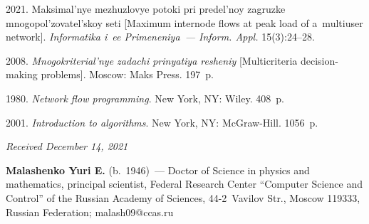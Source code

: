   \begin{multicols}{2}

\renewcommand{\bibname}{\protect\rmfamily References}

{\small\frenchspacing
 {%
 \begin{thebibliography}{9}
 2021. Maksimal'nye mezhuzlovye potoki pri predel'noy 
 zagruzke mnogopol'zovatel'skoy seti [Maximum internode flows at peak load of a~multiuser network]. 
 \textit{Informatika i~ee Primeneniya~--- Inform. Appl.} 15(3):24--28.
 
 \columnbreak
 
 2008. \textit{Mnogokriterial'nye zadachi prinyatiya resheniy} [Multicriteria decision-making problems]. 
 Moscow: Maks Press. 197~p.
 
 \vspace*{-3pt}
 
 
 1980. \textit{Network flow programming}. New York, NY: Wiley. 408~p.
 
  \vspace*{-3pt}
  
 2001. \textit{Introduction to algorithms}. New York, NY: McGraw-Hill. 1056~p.
 
 \end{thebibliography}

 }
 }

\end{multicols}

\vspace*{-6pt}

\hfill{\small\textit{Received December 14, 2021}}


 
\Contrl

\noindent
\textbf{Malashenko Yuri E.} (b.\ 1946)~--- 
Doctor of Science in physics and mathematics, principal scientist, Federal Research Center 
``Computer Science and Control'' of the Russian Academy of Sciences, 
44-2~Vavilov Str., Moscow 119333, Russian Federation; \mbox{malash09@ccas.ru}


\label{end\stat}

\renewcommand{\bibname}{\protect\rm Литература} 